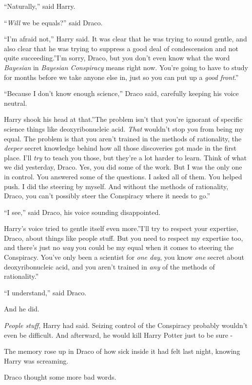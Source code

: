 ``Naturally,'' said Harry.

``\emph{Will} we be equals?'' said Draco.

``I'm afraid not,'' Harry said. It was clear that he was trying to sound
gentle, and also clear that he was trying to suppress a good deal of
condescension and not quite succeeding.''I'm sorry, Draco, but you don't
even know what the word \emph{Bayesian} in \emph{Bayesian Conspiracy}
means right now. You're going to have to study for months before we take
anyone else in, just so you can put up a \emph{good front}.''

``Because I don't know enough science,'' Draco said, carefully keeping
his voice neutral.

Harry shook his head at that.''The problem isn't that you're ignorant of
specific science things like deoxyribonucleic acid. \emph{That} wouldn't
stop you from being my equal. The problem is that you aren't trained in
the methods of rationality, the \emph{deeper} secret knowledge behind
how all those discoveries got made in the first place. I'll \emph{try}
to teach you those, but they're a lot harder to learn. Think of what we
did yesterday, Draco. Yes, you did some of the work. But I was the only
one in control. You answered some of the questions. I asked all of them.
You helped push. I did the steering by myself. And without the methods
of rationality, Draco, you can't possibly steer the Conspiracy where it
needs to go.''

``I see,'' said Draco, his voice sounding disappointed.

Harry's voice tried to gentle itself even more.''I'll try to respect
your expertise, Draco, about things like people stuff. But you need to
respect my expertise too, and there's just no \emph{way} you could be my
equal when it comes to steering the Conspiracy. You've only been a
scientist for \emph{one day}, you know \emph{one} secret about
deoxyribonucleic acid, and you aren't trained in \emph{any} of the
methods of rationality.''

``I understand,'' said Draco.

And he did.

\emph{People stuff,} Harry had said. Seizing control of the Conspiracy
probably wouldn't even be difficult. And afterward, he would kill Harry
Potter just to be sure -

The memory rose up in Draco of how sick inside it had felt last night,
knowing Harry was screaming.

Draco thought some more bad words.

